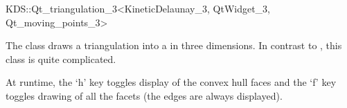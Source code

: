 

\begin{ccRefClass}{KDS::Qt_triangulation_3<KineticDelaunay_3, QtWidget_3, Qt_moving_points_3>}  %


\ccDefinition
  
The class draws a triangulation into a  in three
dimensions. In contrast to
, this class is quite complicated.

At runtime, the `h' key toggles display of the convex hull faces and
the `f' key toggles drawing of all the facets (the edges are always
displayed).


\ccCreation
{}  %



\end{ccRefClass}


